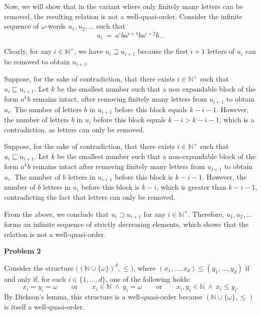 \documentclass[12pt]{article}
\begin{document}
	\medskip
	
	Now, we will show that in the variant where only finitely many letters can
	be removed, the resulting relation is not a well-quasi-order. Consider the
	infinite sequence of \(\omega\)-words \(u_{1}, u_{2}, \ldots\) such that
	\[ u_{i} \ = \ a^{i} b a^{i + 1} b a^{i + 2} b \ldots \]
	
	Clearly, for any \(i \in \mathbb{N}^{+}\), we have \(u_{i} \sqsupseteq
	u_{i + 1}\) because the first \(i + 1\) letters of \(u_{i}\) can be removed
	to obtain \(u_{i + 1}\).
	
	\medskip
	
	Suppose, for the sake of contradiction, that there exists \(i \in
	\mathbb{N}^{+}\) such that \(u_{i} \sqsubseteq u_{i + 1}\). Let \(k\) be the
	smallest number such that a non expandable block of the form \(a^{k} b\)
	remains intact, after removing finitely many letters from \(u_{i + 1}\) to
	obtain \(u_{i}\). The number of letters \(b\) in \(u_{i + 1}\) before this
	block equals \(k - i - 1\). However, the number of letters \(b\) in
	\(u_{i}\) before this block equals \(k - i > k - i - 1\), which is a
	contradiction, as letters can only be removed.
	
	\medskip
	
	Suppose, for the sake of contradiction, that there exists \(i \in
	\mathbb{N}^{+}\) such that \(u_{i} \sqsubseteq u_{i + 1}\). Let \(k\) be the
	smallest number such that a non-expandable block of the form \(a^{k} b\)
	remains intact after removing finitely many letters from \(u_{i + 1}\) to
	obtain \(u_{i}\). The number of \(b\) letters in \(u_{i + 1}\) before this
	block is \(k - i - 1\). However, the number of \(b\) letters in \(u_{i}\)
	before this block is \(k - i\), which is greater than \(k - i - 1\),
	contradicting the fact that letters can only be removed.
	
	\medskip
	
	From the above, we conclude that \(u_{i} \sqsupset u_{i + 1}\) for any \(i
	\in \mathbb{N}^{+}\). Therefore, \(u_{1}, u_{2}, \ldots\) forms an infinite
	sequence of strictly decreasing elements, which shows that the relation is
	not a well-quasi-order.
	
	\bigskip
	
	\textbf{Problem 2}
	
	\medskip
	
	Consider the structure \(\big( (\mathbb{N} \cup \{\omega\})^{d}, \leqslant
	\! \big)\), where \((x_{1}, \ldots, x_{d}) \leqslant (y_{1}, \ldots,
	y_{d})\) if and only if, for each \(i \in \{1, \ldots, d\}\), one of the
	following holds:
	\[ x_{i} = y_{i} = \omega \qquad \text{or} \qquad x_{i} \in \mathbb{N} \
	\wedge \ y_{i} = \omega \qquad \text{or} \qquad x_{i}, y_{i} \in \mathbb{N}
	\ \wedge \ x_{i} \leqslant y_{i} \text{.} \]
	By Dickson's lemma, this structure is a well-quasi-order because
	\((\mathbb{N} \cup \{\omega\}, \leqslant)\) is itself a well-quasi-order.
	
\end{document}
